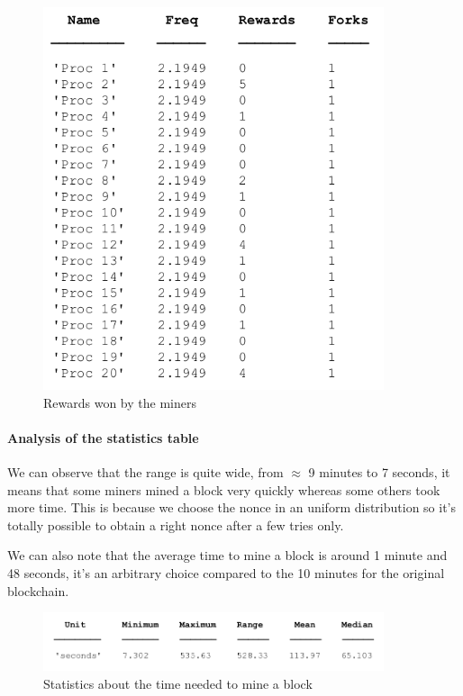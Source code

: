 \begin{figure}[ht]
\centering
\includegraphics[width=10cm]{Figures/rewards}
\caption{Rewards won by the miners}
\end{figure}
\medskip

\paragraph{Analysis of the statistics table}

We can observe that the range is quite wide, from $\approx$ 9 minutes to 7 seconds, it means that some miners mined a block very quickly whereas some others took more time. This is because we choose the nonce in an uniform distribution so it's totally possible to obtain a right nonce after a few tries only. \newline

We can also note that the average time to mine a block is around 1 minute and 48 seconds, it's an arbitrary choice compared to the 10 minutes for the original blockchain.
\clearpage

\begin{figure}[ht]
\centering
\includegraphics[width=10cm]{Figures/stats}
\caption{Statistics about the time needed to mine a block}
\end{figure}
\medskip



